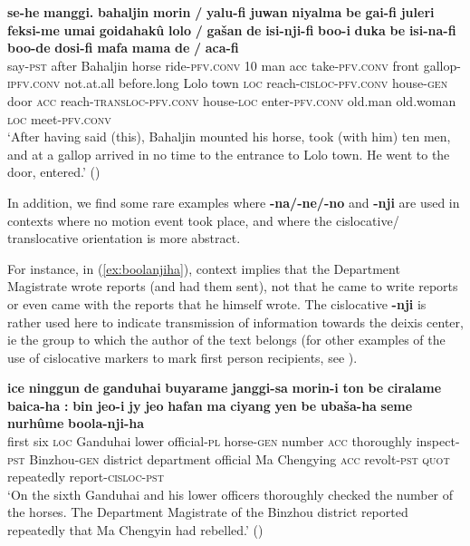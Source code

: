 \documentclass{article}
\newcommand{\ipa}[1]{\textbf{{\phon\mbox{#1}}}} %
\begin{document}
\begin{exe}
\ex \label{ex:isinafi}
\gll
\ipa{se-he} 	\ipa{manggi.} 	\ipa{bahaljin} 	\ipa{morin} 	\ipa{/} 	\ipa{yalu-fi} 	\ipa{juwan} 	\ipa{niyalma} 	\ipa{be} 	\ipa{gai-fi} 	\ipa{juleri} 	\ipa{feksi-me} 	\ipa{umai} 	\ipa{goidahakû} 	\ipa{lolo} 	\ipa{/} 	\ipa{gašan} 	\ipa{de} 	\ipa{isi-nji-fi} 	\ipa{boo-i} 	\ipa{duka} 	\ipa{be} 	\ipa{isi-na-fi} 	\ipa{boo-de} 	\ipa{dosi-fi} 	\ipa{mafa} 	\ipa{mama} 	\ipa{de} 	\ipa{/} 	\ipa{aca-fi} \\
say-\textsc{pst} after Bahaljin horse { } ride-\textsc{pfv.conv} 10 man acc take-\textsc{pfv.conv} front gallop-\textsc{ipfv.conv} not.at.all before.long Lolo { } town \textsc{loc} reach-\textsc{cisloc-pfv.conv} house-\textsc{gen} door \textsc{acc} reach-\textsc{transloc-pfv.conv} house-\textsc{loc} enter-\textsc{pfv.conv} old.man old.woman \textsc{loc} { } meet-\textsc{pfv.conv} \\
\glt `After having said (this), Bahaljin mounted his horse, took (with him) ten men, and at a gallop arrived in no time to the entrance to Lolo town. He went to the door, entered.' (\citealt[68;3a/96]{jaxontov93nisan})
\end{exe}

In addition, we find some rare examples where  \ipa{-na/-ne/-no} and \ipa{-nji} are used in contexts where no motion event took place, and where the cislocative/ translocative orientation is more abstract. 

For instance, in (\ref{ex:boolanjiha}), context implies that the Department Magistrate wrote reports (and had them sent), not that he came to write reports or even came with the reports that he himself wrote. The cislocative \ipa{-nji} is rather used here to indicate transmission of information towards the deixis center, ie the group to which the author of the text belongs (for other examples of the use of cislocative markers to mark first person recipients,  see \citealt{jacques14inverse}).

\begin{exe}
\ex \label{ex:boolanjiha}
\gll
\ipa{ice} 	\ipa{ninggun} 	\ipa{de} 	\ipa{ganduhai} 	\ipa{buyarame} 	\ipa{janggi-sa} 	\ipa{morin-i} 	\ipa{ton} 	\ipa{be} 	\ipa{ciralame} 	\ipa{baica-ha} 	\ipa{:} 	{\ipa{bin} 	\ipa{jeo-i}} 	\ipa{jy} 	\ipa{jeo} 	\ipa{hafan} 	\ipa{ma} 	{\ipa{ciyang} 	\ipa{yen}} 	\ipa{be} 	\ipa{ubaša-ha} 	\ipa{seme} 	\ipa{nurhûme} 	\ipa{boola-nji-ha} 	\\
first six \textsc{loc} Ganduhai lower official-\textsc{pl} horse-\textsc{gen} number \textsc{acc} thoroughly inspect-\textsc{pst} { } Binzhou-\textsc{gen} district department official Ma Chengying \textsc{acc} revolt-\textsc{pst} \textsc{quot} repeatedly report-\textsc{cisloc-pst} \\
\glt `On the sixth Ganduhai and his lower officers thoroughly checked the number of the horses. The Department Magistrate of the Binzhou district reported repeatedly that Ma Chengyin had rebelled.' (\citealt[88/47]{cosmo06dzengseo})
\end{exe}
\end{document}
